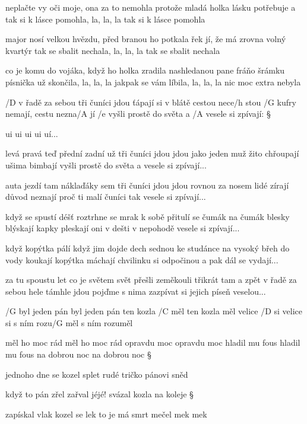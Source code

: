 neplačte vy oči moje, ona za to nemohla
protože mladá holka lásku potřebuje
a tak si k lásce pomohla, la, la, la
tak si k lásce pomohla \s

major nosí velkou hvězdu, před branou ho potkala
řek jí, že má zrovna volný kvartýr
tak se sbalit nechala, la, la, la
tak se sbalit nechala \s

co je komu do vojáka, když ho holka zradila
nashledanou pane fráňo šrámku
písnička už skončila, la, la, la
jakpak se vám líbila, la, la, la
nic moc extra nebyla




/D v řadě za sebou tři čuníci jdou
ťápají si v blátě cestou nece/h stou
/G kufry nemají, cestu nezna/A jí
/e vyšli prostě do světa a /A vesele si zpívají: \S

ui ui ui ui uí... \s

levá pravá teď přední zadní už
tři čuníci jdou jdou jako jeden muž
žito chřoupají ušima bimbají
vyšli prostě do světa a vesele si zpívají... \s

auta jezdí tam náklaďáky sem
tři čuníci jdou jdou rovnou za nosem
lidé zírají důvod neznají
proč ti malí čuníci tak vesele si zpívají... \s

když se spustí déšť roztrhne se mrak
k sobě přitulí se čumák na čumák
blesky blýskají kapky pleskají
oni v dešti v nepohodě vesele si zpívají... \s

když kopýtka pálí když jim dojde dech
sednou ke studánce na vysoký břeh
do vody koukají kopýtka máchají
chvilinku si odpočinou a pak dál se vydají... \s

za tu spoustu let co je světem svět
přešli zeměkouli třikrát tam a zpět
v řadě za sebou hele támhle jdou
pojďme s nima zazpívat si jejich píseň veselou...




/G byl jeden pán \/ byl jeden pán
ten kozla /C měl \/ ten kozla měl
velice /D si \/ velice si
s ním rozu/G měl \/ s ním rozuměl \s

měl ho moc rád \/ měl ho moc rád
opravdu moc \/ opravdu moc
hladil mu fous \/ hladil mu fous
na dobrou noc \/ na dobrou noc \S


jednoho dne
se kozel splet
rudé tričko
pánovi sněd \s

když to pán zřel
zařval jéjé!
svázal kozla
na koleje \S


zapískal vlak
kozel se lek
to je má smrt
mečel mek mek \s

